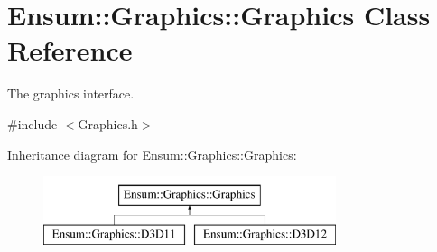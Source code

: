 \hypertarget{class_ensum_1_1_graphics_1_1_graphics}{}\section{Ensum\+:\+:Graphics\+:\+:Graphics Class Reference}
\label{class_ensum_1_1_graphics_1_1_graphics}


The graphics interface.  




{\ttfamily \#include $<$Graphics.\+h$>$}

Inheritance diagram for Ensum\+:\+:Graphics\+:\+:Graphics\+:\begin{figure}[H]
\begin{center}
\leavevmode
\includegraphics[height=2.000000cm]{class_ensum_1_1_graphics_1_1_graphics}
\end{center}
\end{figure}
